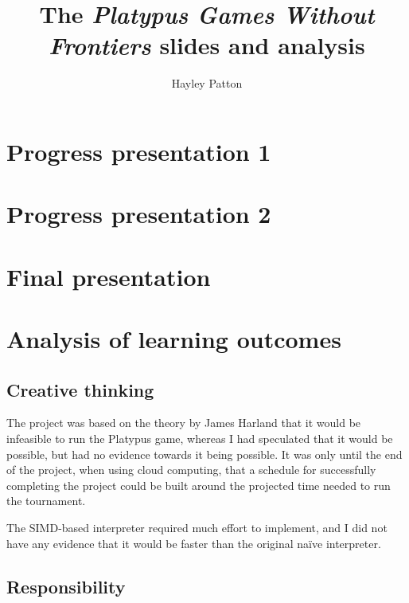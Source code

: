 \documentclass[a4paper]{article}
\begin{document}
\title{The \emph{Platypus Games Without Frontiers} slides and analysis}
\author{Hayley Patton}
\maketitle

\tableofcontents

\newpage

\section{Progress presentation 1}



\section{Progress presentation 2}



\section{Final presentation}



\section{Analysis of learning outcomes}

\subsection{Creative thinking}

The project was based on the theory by James Harland that it would
be infeasible to run the Platypus game, whereas I had speculated that
it would be possible, but had no evidence towards it being possible. It
was only until the end of the project, when using cloud computing,
that a schedule for successfully completing the project could be built
around the projected time needed to run the tournament.

The SIMD-based interpreter required much effort to implement, and I
did not have any evidence that it would be faster than the original
na\"ive interpreter.

\subsection{Responsibility}
\end{document}
